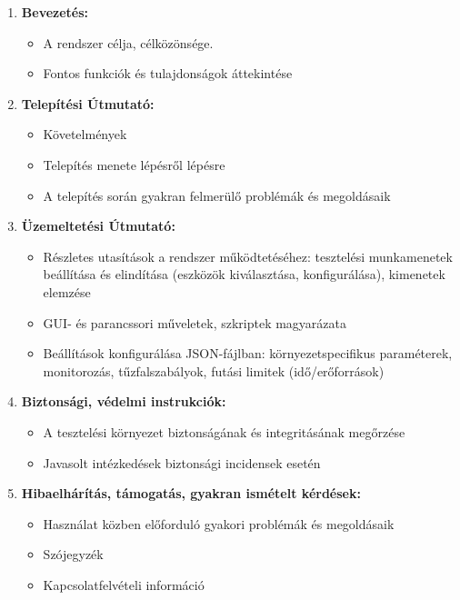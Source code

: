 \documentclass{scrreprt}
\begin{document}
\begin{enumerate}
      \item \textbf{Bevezetés:}
            \begin{itemize}
                  \item A rendszer célja, célközönsége.
                  \item Fontos funkciók és tulajdonságok áttekintése
            \end{itemize}
      \item \textbf{Telepítési Útmutató:}
            \begin{itemize}
                  \item Követelmények
                  \item Telepítés menete lépésről lépésre
                  \item A telepítés során gyakran felmerülő problémák és megoldásaik
            \end{itemize}
      \item \textbf{Üzemeltetési Útmutató:}
            \begin{itemize}
                  \item Részletes utasítások a rendszer működtetéséhez: tesztelési munkamenetek beállítása és elindítása (eszközök kiválasztása, konfigurálása), kimenetek elemzése
                  \item GUI- és parancssori műveletek, szkriptek magyarázata
                  \item Beállítások konfigurálása JSON-fájlban: környezetspecifikus paraméterek, monitorozás, tűzfalszabályok, futási limitek (idő/erőforrások)
            \end{itemize}
      \item \textbf{Biztonsági, védelmi instrukciók:}
            \begin{itemize}
                  \item A tesztelési környezet biztonságának és integritásának megőrzése
                  \item Javasolt intézkedések biztonsági incidensek esetén
            \end{itemize}
      \item \textbf{Hibaelhárítás, támogatás, gyakran ismételt kérdések:}
            \begin{itemize}
                  \item Használat közben előforduló gyakori problémák és megoldásaik
                  \item Szójegyzék
                  \item Kapcsolatfelvételi információ
            \end{itemize}
\end{enumerate}
\end{document}
